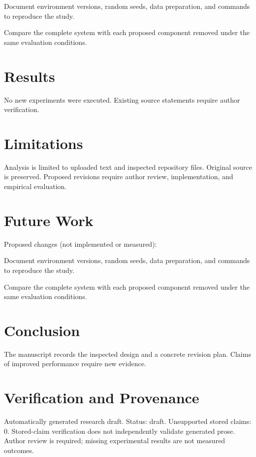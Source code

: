 \documentclass[conference]{IEEEtran}
\begin{document}
Document environment versions, random seeds, data preparation, and commands to reproduce the study.

Compare the complete system with each proposed component removed under the same evaluation conditions.

\section{Results}

No new experiments were executed. Existing source statements require author verification.

\section{Limitations}

Analysis is limited to uploaded text and inspected repository files. Original source is preserved. Proposed revisions require author review, implementation, and empirical evaluation.

\section{Future Work}

Proposed changes (not implemented or measured):

Document environment versions, random seeds, data preparation, and commands to reproduce the study.

Compare the complete system with each proposed component removed under the same evaluation conditions.

\section{Conclusion}

The manuscript records the inspected design and a concrete revision plan. Claims of improved performance require new evidence.

\section{Verification and Provenance}

Automatically generated research draft. Status: draft. Unsupported stored claims: 0. Stored-claim verification does not independently validate generated prose. Author review is required; missing experimental results are not measured outcomes.
\end{document}
